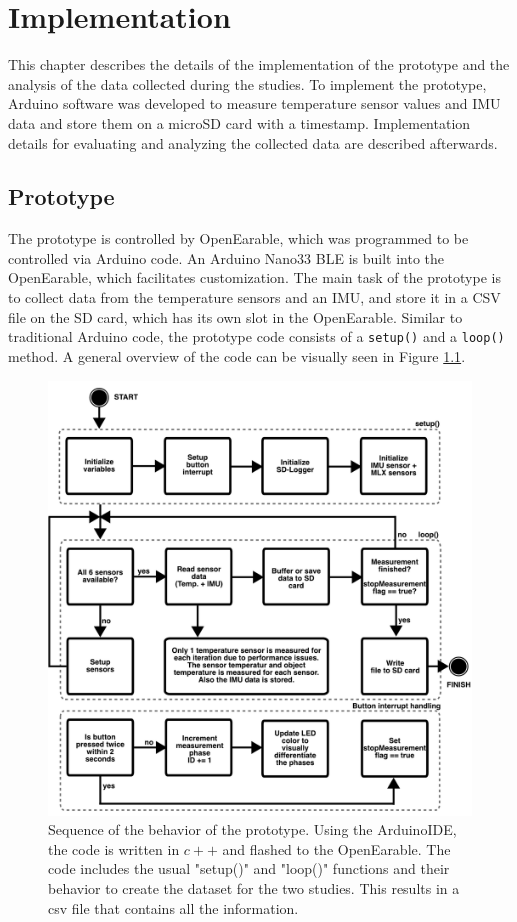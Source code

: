 \chapter{Implementation}
\label{ch:Implementation}
This chapter describes the details of the implementation of the prototype and the analysis of the data collected during the studies.
To implement the prototype, Arduino software was developed to measure temperature sensor values and IMU data and store them on a microSD card with a timestamp.
Implementation details for evaluating and analyzing the collected data are described afterwards.

\section{Prototype}
The prototype is controlled by OpenEarable, which was programmed to be controlled via Arduino code. 
An Arduino Nano33 BLE is built into the OpenEarable, which facilitates customization. 
The main task of the prototype is to collect data from the temperature sensors and an IMU, and store it in a CSV file on the SD card, which has its own slot in the OpenEarable. 
Similar to traditional Arduino code, the prototype code consists of a \texttt{setup()} and a \texttt{loop()} method.
A general overview of the code can be visually seen in Figure \ref{fig:ch:Implementation:ArduinoCodeProcedure}.

\begin{figure}[!t]
    \centering
    \includegraphics[width=\textwidth]{thesis-doc/images/ArduinoCodeProcedure.pdf}
    \caption{Sequence of the behavior of the prototype. Using the ArduinoIDE, the code is written in $c++$ and flashed to the OpenEarable. The code includes the usual "setup()" and "loop()" functions and their behavior to create the dataset for the two studies.
This results in a csv file that contains all the information.}
    \label{fig:ch:Implementation:ArduinoCodeProcedure}
\end{figure}

